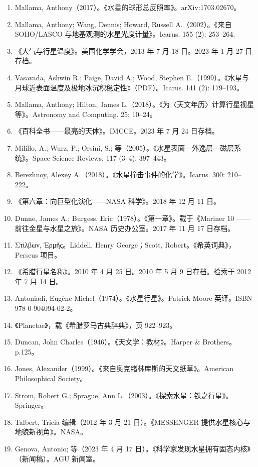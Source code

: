 \begin{enumerate}
    \item Mallama, Anthony（2017）。《水星的球形总反照率》。arXiv:1703.02670。
    \item Mallama, Anthony; Wang, Dennis; Howard, Russell A.（2002）。《来自 SOHO/LASCO 与地基观测的水星光度计量》。Icarus. 155 (2): 253–264.
    \item 《大气与行星温度》。美国化学学会，2013 年 7 月 18 日。2023 年 1 月 27 日存档。
    \item Vasavada, Ashwin R.; Paige, David A.; Wood, Stephen E.（1999）。《水星与月球近表面温度及极地冰沉积稳定性》（PDF）。Icarus. 141 (2): 179–193。
    \item Mallama, Anthony; Hilton, James L.（2018）。《为〈天文年历〉计算行星视星等》。Astronomy and Computing. 25: 10–24。
    \item 《百科全书——最亮的天体》。IMCCE。2023 年 7 月 24 日存档。
    \item Milillo, A.; Wurz, P.; Orsini, S.; 等（2005）。《水星表面—外逸层—磁层系统》。Space Science Reviews. 117 (3–4): 397–443。
    \item Berezhnoy, Alexey A.（2018）。《水星撞击事件的化学》。Icarus. 300: 210–222。
    \item 《第六章：向巨型化演化——NASA 科学》。2018 年 12 月 11 日。
    \item Dunne, James A.; Burgess, Eric（1978）。《第一章》。载于《Mariner 10 —— 前往金星与水星之旅》。NASA 历史办公室。2017 年 11 月 17 日存档。
    \item Στίλβων, Ἑρμῆς。Liddell, Henry George；Scott, Robert。《希英词典》，Perseus 项目。
    \item 《希腊行星名称》。2010 年 4 月 25 日。2010 年 5 月 9 日存档。检索于 2012 年 7 月 14 日。
    \item Antoniadi, Eugène Michel（1974）。《水星行星》。Patrick Moore 英译。ISBN 978-0-904094-02-2。
    \item 《Planetae》，载《希腊罗马古典辞典》，页 922–923。
    \item Duncan, John Charles（1946）。《天文学：教材》。Harper \& Brothers。p.125。
    \item Jones, Alexander（1999）。《来自奥克绪林库斯的天文纸草》。American Philosophical Society。
    \item Strom, Robert G.; Sprague, Ann L.（2003）。《探索水星：铁之行星》。Springer。
    \item Talbert, Tricia 编辑（2012 年 3 月 21 日）。《MESSENGER 提供水星核心与地貌新视角》。NASA。
    \item Genova, Antonio; 等（2023 年 4 月 17 日）。《科学家发现水星拥有固态内核》（新闻稿）。AGU 新闻室。

\end{enumerate}
